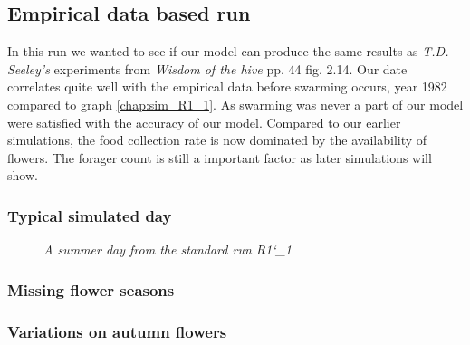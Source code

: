 	\subsection{Empirical data based run}
	In this run we wanted to see if our model can produce the same results as \textit{T.D. Seeley's} experiments from \textit{Wisdom of the hive} pp. 44 fig. 2.14. Our date correlates quite well with the empirical data before swarming occurs, year 1982 compared to graph \ref{chap:sim_R1_1}. As swarming was never a part of our model were satisfied with the accuracy of our model.
	Compared to our earlier simulations, the food collection rate is now dominated by the availability of flowers. The forager count is still a important factor as later simulations will show.
	
	\subsubsection{Typical simulated day}
		\begin{figure}
			\centering
			\caption{\textit{A summer day from the standard run R1\char`_1}}
			\label{fig:day158}
		\end{figure}
	 
	\subsubsection{Missing flower seasons}
	\subsubsection{Variations on autumn flowers}
	
